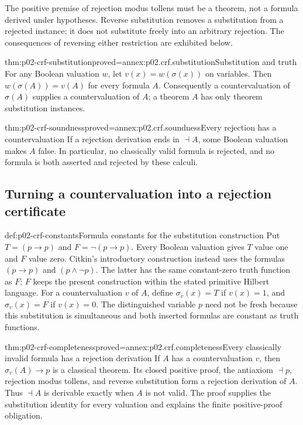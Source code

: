 

The positive premise of rejection modus tollens must be a theorem,
not a formula derived under hypotheses. Reverse substitution removes
a substitution from a rejected instance; it does not substitute freely
into an arbitrary rejection. The consequences of reversing either
restriction are exhibited below.

\begin{hblemma}{thm:p02-crf-substitution}{proved=annex:p02.crf.substitution}{Substitution and truth}
For any Boolean valuation \(w\), let \(v(x)=w(\sigma(x))\) on
variables. Then \(w(\sigma(A))=v(A)\) for every formula \(A\).
Consequently a countervaluation of \(\sigma(A)\) supplies a
countervaluation of \(A\); a theorem \(A\) has only theorem
substitution instances.
\end{hblemma}

\begin{hbtheorem}{thm:p02-crf-soundness}{proved=annex:p02.crf.soundness}{Every rejection has a countervaluation}
If a rejection derivation ends in \(\dashv A\), some Boolean
valuation makes \(A\) false. In particular, no classically valid
formula is rejected, and no formula is both asserted and rejected
by these calculi.
\end{hbtheorem}

\subsection{Turning a countervaluation into a rejection certificate}
\label{sec:p02-crf-certificate}

\begin{hbdefinition}{def:p02-crf-constants}{Formula constants for the substitution construction}
Put \(T=(p\to p)\) and \(F=\neg(p\to p)\).
Every Boolean valuation gives \(T\) value one and \(F\) value zero.
Citkin's introductory construction instead uses the formulas
\((p\to p)\) and \((p\land\neg p)\). The latter has the same
constant-zero truth function as \(F\); \(F\) keeps the present
construction within the stated primitive Hilbert language.
For a countervaluation \(v\) of \(A\), define \(\sigma_v(x)=T\)
if \(v(x)=1\), and \(\sigma_v(x)=F\) if \(v(x)=0\).
The distinguished variable \(p\) need not be fresh because this
substitution is simultaneous and both inserted formulas are constant
as truth functions.
\end{hbdefinition}

\begin{hbtheorem}{thm:p02-crf-completeness}{proved=annex:p02.crf.completeness}{Every classically invalid formula has a rejection derivation}
If \(A\) has a countervaluation \(v\), then
\(\sigma_v(A)\to p\) is a classical theorem. Its closed positive
proof, the antiaxiom \(\dashv p\), rejection modus tollens, and
reverse substitution form a rejection derivation of \(A\).
Thus \(\dashv A\) is derivable exactly when \(A\) is not valid.
The proof supplies the substitution identity for every valuation and
explains the finite positive-proof obligation.
\end{hbtheorem}

